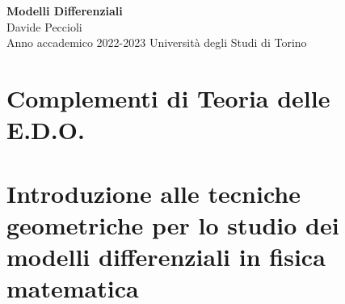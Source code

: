 \documentclass[11pt, titlepage, twoside, a4paper]{book}
\begin{document}
\frontmatter

\begin{titlepage}
\null
\vfill
\begin{center}
{\Huge \textbf{Modelli Differenziali}}\\
\vspace{1em}
{\large Davide Peccioli}\\
\vspace{0.6em}
{\large Anno accademico 2022-2023}
\vfill
Università degli Studi di Torino
\end{center}
\end{titlepage}
{\pagestyle{empty}
\null\cleardoublepage}


\fancyhead{} %
\fancyfoot{}
\fancyfoot[C]{\thepage}
\renewcommand{\headrulewidth}{0.4pt}
\renewcommand{\footrulewidth}{0pt}
\pagestyle{fancy}

\tableofcontents\cleardoublepage


\mainmatter

\part{Complementi di Teoria delle E.D.O.}


\part{Introduzione alle tecniche geometriche per lo studio dei modelli differenziali in fisica matematica}





\backmatter


\cleardoublepage\normalem
\printbibliography
\end{document}

